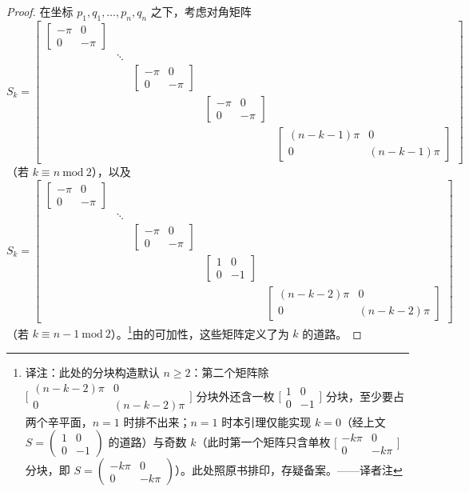 \begin{proof}
在坐标 $p_1,q_1,\dotsc,p_n,q_n$ 之下，考虑对角矩阵
\[
S_k=\left[\begin{array}{ccccc}
\begin{bmatrix}-\pi&0\\0&-\pi\end{bmatrix}&&&&\\
&\ddots&&&\\
&&\begin{bmatrix}-\pi&0\\0&-\pi\end{bmatrix}&&\\
&&&\begin{bmatrix}-\pi&0\\0&-\pi\end{bmatrix}&\\
&&&&\begin{bmatrix}(n-k-1)\pi&0\\0&(n-k-1)\pi\end{bmatrix}
\end{array}\right]
\]
（若 $k\equiv n\ \mathrm{mod}\ 2$），以及
\[
S_k=\left[\begin{array}{ccccc}
\begin{bmatrix}-\pi&0\\0&-\pi\end{bmatrix}&&&&\\
&\ddots&&&\\
&&\begin{bmatrix}-\pi&0\\0&-\pi\end{bmatrix}&&\\
&&&\begin{bmatrix}1&0\\0&-1\end{bmatrix}&\\
&&&&\begin{bmatrix}(n-k-2)\pi&0\\0&(n-k-2)\pi\end{bmatrix}
\end{array}\right]
\]
（若 $k\equiv n-1\ \mathrm{mod}\ 2$）。\footnote{译注：此处的分块构造默认 $n\geq2$：第二个矩阵除 $\bigl[\begin{smallmatrix}(n-k-2)\pi&0\\0&(n-k-2)\pi\end{smallmatrix}\bigr]$ 分块外还含一枚 $\bigl[\begin{smallmatrix}1&0\\0&-1\end{smallmatrix}\bigr]$ 分块，至少要占两个辛平面，$n=1$ 时排不出来；$n=1$ 时本引理仅能实现 $k=0$（经上文 $S=\begin{pmatrix}1&0\\0&-1\end{pmatrix}$ 的道路）与奇数 $k$（此时第一个矩阵只含单枚 $\bigl[\begin{smallmatrix}-k\pi&0\\0&-k\pi\end{smallmatrix}\bigr]$ 分块，即 $S=\begin{pmatrix}-k\pi&0\\0&-k\pi\end{pmatrix}$）。此处照原书排印，存疑备案。——译者注}由\trMaslovIndex{}的可加性，这些矩阵定义了\trMaslovIndex{}为 $k$ 的道路。

\end{proof}
